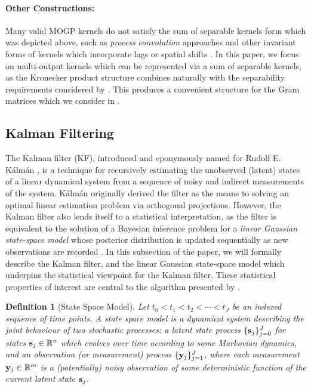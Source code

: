 \documentclass[10pt]{article}
\newtheorem{definition}{Definition}[section]
\numberwithin{equation}{section}
\begin{document}
\paragraph{Other Constructions:} Many valid MOGP kernels do not satisfy the sum of separable kernels form which was depicted above, such as \emph{process convolution} approaches \citep{Boyle-Dependent-GP-2004} and other invariant forms of kernels which incorporate lags or spatial shifts \citep{Alvarez-Vector-Kernels-2012}. In this paper, we focus on multi-output kernels which can be represented via a sum of separable kernels, as the Kronecker product structure combines naturally with the separability requirements considered by \citet{Todescato-Efficient-2020}. This produces a convenient structure for the Gram matrices which we consider in .

\subsection{Kalman Filtering}
\label{subsec:kalman}

The Kalman filter (KF), introduced and eponymously named for Rudolf E. K{\'a}lm{\'a}n \citeyearpar{Kalman-Filter-1960}, is a technique for recursively estimating the unobserved (latent) states of a linear dynamical system from a sequence of noisy and indirect measurements of the system. K{\'a}lm{\'a}n originally derived the filter as the means to solving an optimal linear estimation problem via orthogonal projections. However, the Kalman filter also lends itself to a statistical interpretation, as the filter is equivalent to the solution of a Bayesian inference problem for a \emph{linear Gaussian state-space model} whose posterior distribution is updated sequentially as new observations are recorded \citep{Bayesian-Filter-Book-2023}. In this subsection of the paper, we will formally describe the Kalman filter, and the linear Gaussian state-space model which underpins the statistical viewpoint for the Kalman filter. These statistical properties of interest are central to the algorithm presented by \citet{Todescato-Efficient-2020}.

\begin{definition}[State Space Model]
\label{def:SSM}  
    Let $t_{0} < t_{1} < t_{2} < \cdots < t_{J}$ be an indexed sequence of time points. A state space model is a dynamical system describing the joint behaviour of two stochastic processes: a {latent state} process $\{\mathbf{s}_{j}\}_{j=0}^{J}$ for states $\mathbf{s}_{j} \in \mathbb{R}^{n}$ which evolves over time according to some Markovian dynamics, and an {observation} (or {measurement}) process $\{\mathbf{y}_{j}\}_{j=1}^{J}$, where each measurement $\mathbf{y}_{j} \in \mathbb{R}^{m}$ is a (potentially) noisy observation of some deterministic function of the current latent state $\mathbf{s}_{j}$.
\end{definition}
\end{document}
